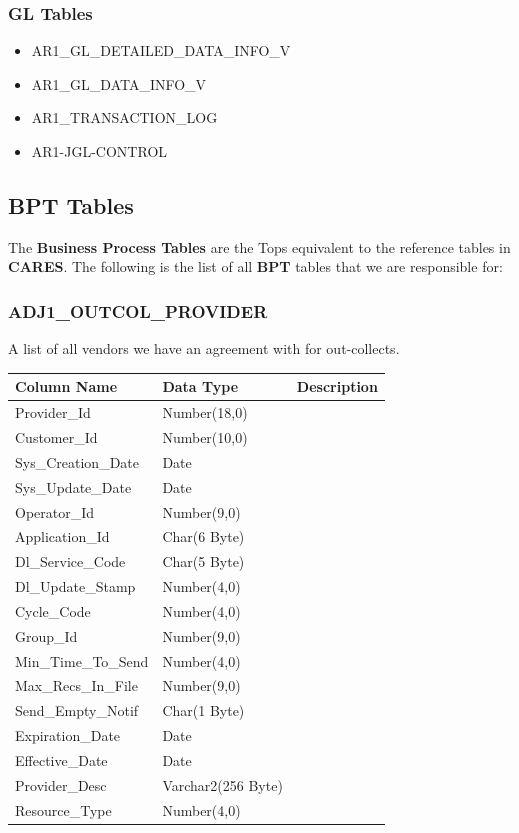 \documentclass[12pt,twoside]{article}
\begin{document}
\normalsize

\subsubsection{GL Tables}
\label{sec:orgheadline97}
\begin{itemize}
\item AR1\_GL\_DETAILED\_DATA\_INFO\_V
\item AR1\_GL\_DATA\_INFO\_V
\item AR1\_TRANSACTION\_LOG
\item AR1-JGL-CONTROL
\end{itemize}

\subsection{BPT Tables}
\label{sec:orgheadline113}
The \textbf{Business Process Tables} are the Tops equivalent to the
reference tables in \textbf{CARES}. The following is the list of all
\textbf{BPT} tables that we are responsible for:

\subsubsection{ADJ1\_OUTCOL\_PROVIDER}
\label{sec:orgheadline99}
A list of all vendors we have an agreement with for out-collects.
\footnotesize

\begin{center}
\begin{tabular}{lll}
\hline
\textbf{Column Name} & \textbf{Data Type} & \textbf{Description}\\
\hline
Provider\_Id & Number(18,0) & \\
Customer\_Id & Number(10,0) & \\
Sys\_Creation\_Date & Date & \\
Sys\_Update\_Date & Date & \\
Operator\_Id & Number(9,0) & \\
Application\_Id & Char(6 Byte) & \\
Dl\_Service\_Code & Char(5 Byte) & \\
Dl\_Update\_Stamp & Number(4,0) & \\
Cycle\_Code & Number(4,0) & \\
Group\_Id & Number(9,0) & \\
Min\_Time\_To\_Send & Number(4,0) & \\
Max\_Recs\_In\_File & Number(9,0) & \\
Send\_Empty\_Notif & Char(1 Byte) & \\
Expiration\_Date & Date & \\
Effective\_Date & Date & \\
Provider\_Desc & Varchar2(256 Byte) & \\
Resource\_Type & Number(4,0) & \\
\hline
\end{tabular}
\end{center}
\end{document}
